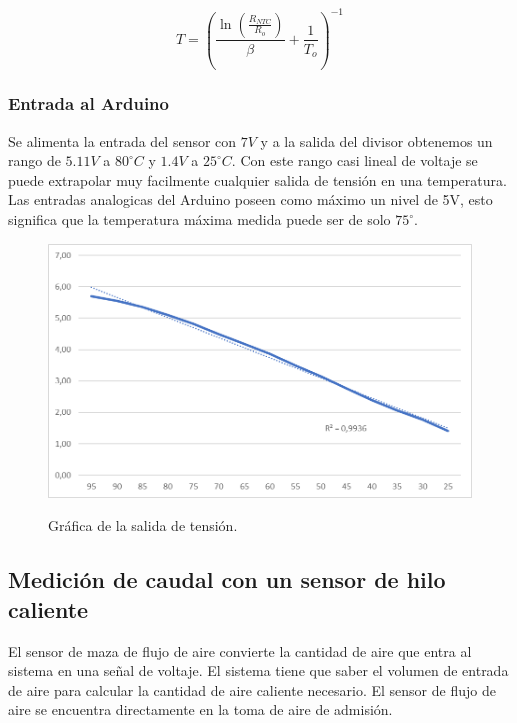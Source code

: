 \documentclass[12pt]{article}
\begin{document}
\begin{equation}
	\label{eqn:Temperatura_NTC}
	T = \left(\frac{\ln{(\frac{R_{NTC}}{R_{o}})}}{\beta} + \frac{1}{T_{o}} \right)^{-1}
\end{equation}

\subsubsection{Entrada al Arduino}

Se alimenta la entrada del sensor con $7V$ y a la salida del divisor obtenemos un rango de $5.11V$ a $80^{\circ}C$ y $1.4V$ a $25^{\circ}C$. Con este rango casi lineal de voltaje se puede extrapolar muy facilmente cualquier salida de tensión en una temperatura. \\

Las entradas analogicas del Arduino poseen como máximo un nivel de 5V, esto significa que la temperatura máxima medida puede ser de solo $75^{\circ}$.

\begin{figure}[H]
\centering
\includegraphics[scale=0.6]{src/imagenes/Grafica_NTC.png}
\label{fgr:Grafica_NTC}
\caption{Gráfica de la salida de tensión.}
\end{figure}

\subsection{Medición de caudal con un sensor de hilo caliente}

El sensor de maza de flujo de aire convierte la cantidad de aire que entra al sistema en una señal de voltaje. El sistema tiene que saber el volumen de entrada de aire para calcular la cantidad de aire caliente necesario. El sensor de flujo de aire se encuentra directamente en la toma de aire de admisión. \\
\end{document}
